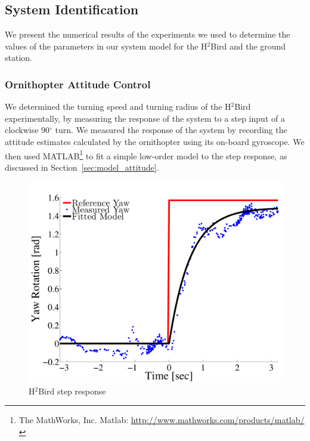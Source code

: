 \documentclass{aamas2013}
\begin{document}
\subsection{System Identification}

We present the numerical results of the experiments we used to determine the
values of the parameters in our system model for the H$^2$Bird and the ground
station.

\subsubsection{Ornithopter Attitude Control}
\label{sec:flight_control}
We determined the turning speed and turning radius of the H$^2$Bird 
experimentally, by measuring the response of the system to a step input of a 
clockwise 90$^{\circ}$ turn. We measured the response of the system by 
recording the attitude estimates calculated by the ornithopter using its 
on-board gyroscope. We then used MATLAB\footnote{The MathWorks, Inc. Matlab:
\href{http://www.mathworks.com/products/matlab/}
     {http://www.mathworks.com/products/matlab/}} 
to fit a simple low-order model to the step response, as discussed in 
Section~\ref{sec:model_attitude}.

\begin{figure}[tb]
\centering
\includegraphics[width=\linewidth]{figures/step_response_total.pdf}
\caption{H$^2$Bird step response}
\label{fig:step_response}
\end{figure}
\end{document}
